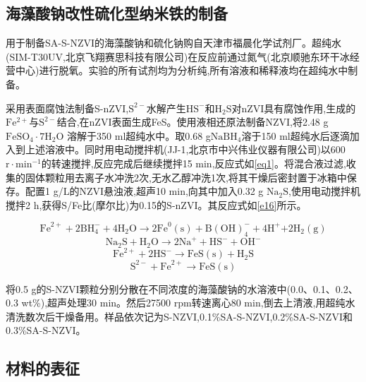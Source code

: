 

\subsection{海藻酸钠改性硫化型纳米铁的制备}

用于制备SA-S-NZVI的海藻酸钠和硫化钠购自天津市福晨化学试剂厂。超纯水(SIM-T30UV,北京飞翔赛思科技有限公司)在反应前通过氮气(北京顺驰东环干冰经营中心)进行脱氧。实验的所有试剂均为分析纯,所有溶液和稀释液均在超纯水中制备。

采用表面腐蚀法制备S-nZVI,$\mathrm{S^{2-}}$水解产生$\mathrm{HS^-}$和$\mathrm{H_2S}$对nZVI具有腐蚀作用,生成的$\mathrm{Fe^{2+}}$与$\mathrm S^{2-}$结合,在nZVI表面生成FeS\cite{ ISI:000382805800072}。使用液相还原法制备NZVI\cite{2020The,LIU2019124193},将2.48 g$\mathrm{FeSO_4\cdot 7H_2O}$ 溶解于350 ml超纯水中。取0.68 g$\mathrm{NaBH_4}$溶于150 ml超纯水后逐滴加入到上述溶液中。同时用电动搅拌机(JJ-1,北京市中兴伟业仪器有限公司)以600 $\mathrm{r\cdot min^{-1}}$的转速搅拌,反应完成后继续搅拌15 min,反应式如\cref{eq1}。将混合液过滤,收集的固体颗粒用去离子水冲洗2次,无水乙醇冲洗1次,将其干燥后密封置于冰箱中保存。配置1 g/L的NZVI悬浊液,超声10 min,向其中加入0.32 g $\mathrm{{Na}_2S}$,使用电动搅拌机搅拌2 h,获得S/Fe比(摩尔比)为0.15的S-nZVI。其反应式如\cref{e16}所示\cite{ ISI:000355774400014}。

\begin{equation}\label{eq1}
    \mathrm{{Fe}^{2+}+2{BH}_4^-+4H_2O}\rightarrow \mathrm{2{Fe}^0\left(s\right)+{B\left(OH\right)}_4^-+4H^+}\mathrm{+2H_2\left(g\right)}
\end{equation}
\begin{equation}
    \mathrm{{Na}_2S+H_2O\rightarrow2{Na}^++{HS}^-+{OH}^-}
\end{equation}
\begin{equation}
    \mathrm{{Fe}^{2+}+2{HS}^-\rightarrow FeS(s)+H_2S}
\end{equation}
\begin{equation}\label{e16}
    \mathrm{S^{2-}+{Fe}^{2+}\rightarrow FeS(s)}
\end{equation}

将0.5 g的S-NZVI颗粒分别分散在不同浓度的海藻酸钠的水溶液中(0.0、0.1、0.2、0.3 wt\%),超声处理30 min。然后27500 rpm转速离心80 min,倒去上清液,用超纯水清洗数次后干燥备用。样品依次记为S-NZVI,0.1\%SA-S-NZVI,0.2\%SA-S-NZVI和0.3\%SA-S-NZVI。

\subsection{材料的表征}

